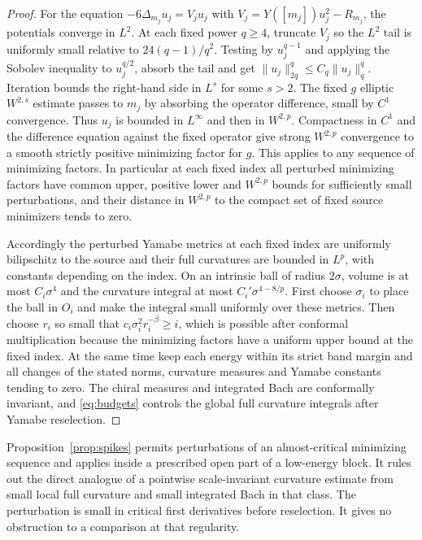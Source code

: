 \documentclass[11pt]{article}
\numberwithin{equation}{section}
\theoremstyle{definition}
\theoremstyle{remark}
\begin{document}
\begin{proof}
For the equation
\(-6\Delta_{m_j}u_j=V_j u_j\) with
\(V_j=Y([m_j])u_j^2-R_{m_j}\), the potentials converge in
\(L^2\). At each fixed power \(q\ge4\), truncate \(V_j\)
so the \(L^2\) tail is uniformly small relative to
\(24(q-1)/q^2\). Testing by \(u_j^{q-1}\) and applying
the Sobolev inequality to \(u_j^{q/2}\), absorb the tail
and get \(\|u_j\|_{2q}^q\le C_q\|u_j\|_q^q\).
Iteration bounds the right-hand side in \(L^s\) for some
\(s>2\). The fixed \(g\) elliptic \(W^{2,s}\) estimate
passes to \(m_j\) by absorbing the operator difference,
small by \(C^1\) convergence. Thus \(u_j\) is bounded in
\(L^\infty\) and then in \(W^{2,p}\). Compactness in
\(C^1\) and the difference equation against the fixed
operator give strong \(W^{2,p}\) convergence to a smooth
strictly positive minimizing factor for \(g\).
This applies to any sequence of minimizing factors.
In particular at each fixed index all perturbed minimizing
factors have common upper, positive lower and \(W^{2,p}\)
bounds for sufficiently small perturbations, and their
distance in \(W^{2,p}\) to the compact set of fixed
source minimizers tends to zero.

Accordingly the perturbed Yamabe metrics at each fixed
index are uniformly bilipschitz to the source and their
full curvatures are bounded in \(L^p\), with constants
depending on the index. On an intrinsic ball of radius
\(2\sigma\), volume is at most \(C_i\sigma^4\) and the
curvature integral at most \(C_i'\sigma^{4-8/p}\).
First choose \(\sigma_i\) to place the ball in \(O_i\)
and make the integral small uniformly over these metrics.
Then choose \(r_i\) so small that
\(c_i\sigma_i^2r_i^{-\beta}\ge i\), which is possible
after conformal multiplication because the minimizing
factors have a uniform upper bound at the fixed index.
At the same time keep each energy within its strict band
margin and all changes of the stated norms, curvature
measures and Yamabe constants tending to zero. The chiral
measures and integrated Bach are conformally invariant,
and \eqref{eq:budgets} controls the global full curvature
integrals after Yamabe reselection.
\end{proof}

Proposition~\ref{prop:spikes} permits perturbations of an
almost-critical minimizing sequence and applies inside a
prescribed open part of a low-energy block. It rules out
the direct analogue of a pointwise scale-invariant
curvature estimate from small local full curvature and
small integrated Bach in that class. The perturbation is
small in critical first derivatives before reselection.
It gives no obstruction to a comparison at that regularity.
\end{document}
